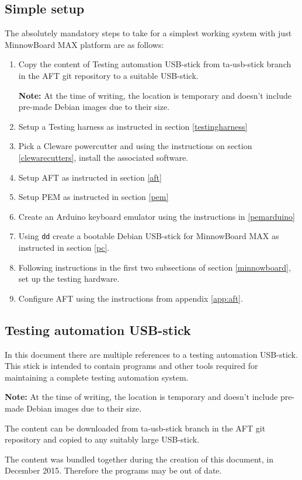 \documentclass[a4paper,11pt]{article}
\newcommand{\note}{\textbf{Note: }}
\newcommand{\cmd}[1]{\texttt{#1}}
\begin{document}
\subsection{Simple setup}
The absolutely mandatory steps to take for a simplest working system with just MinnowBoard MAX platform are as follows:
\begin{enumerate}
	\item Copy the content of Testing automation USB-stick from ta-usb-stick branch in the AFT git repository to a suitable USB-stick.

\note{At the time of writing, the location is temporary and doesn't include pre-made Debian images due to their size.}
	\item Setup a Testing harness as instructed in section \ref{testingharness}
	\item Pick a Cleware powercutter and using the instructions on section \ref{clewarecutters}, install the associated software.
	\item Setup AFT as instructed in section \ref{aft}
	\item Setup PEM as instructed in section \ref{pem}
	\item Create an Arduino keyboard emulator using the instructions in \ref{pemarduino}
	\item Using \cmd{dd} create a bootable Debian USB-stick for MinnowBoard MAX as instructed in section \ref{pc}.
	\item Following instructions in the first two subsections of section \ref{minnowboard}, set up the testing hardware.
	\item Configure AFT using the instructions from appendix \ref{app:aft}.
\end{enumerate}

\subsection{Testing automation USB-stick}
In this document there are multiple references to a testing automation USB-stick. This stick is intended to contain programs and other tools required for maintaining a complete testing automation system.

\note{At the time of writing, the location is temporary and doesn't include pre-made Debian images due to their size.}

The content can be downloaded from ta-usb-stick branch in the AFT git repository and copied to any suitably large USB-stick.

The content was bundled together during the creation of this document, in December 2015. Therefore the programs may be out of date.
\end{document}
